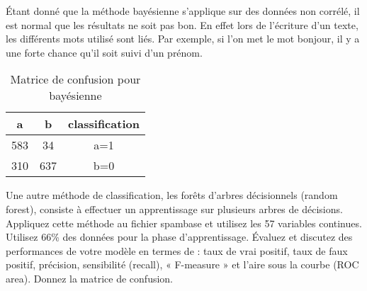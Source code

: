 \begin{homeworkProblem}
\begin{homeworkSection}{3.2}
{			Étant donné que la méthode bayésienne s'applique sur des données non corrélé, il est normal que les résultats ne soit pas bon.
			En effet lors de l'écriture d'un texte, les différents mots utilisé sont liés.
			Par exemple, si l'on met le mot bonjour, il y a une forte chance qu'il soit suivi d'un prénom.
			
			}
			\begin{table}
			\centering
			\begin{tabular}{|c|c||c|}
			
			\hline 
			a & b & classification \\ 
			\hline 
			583 & 34 & a=1 \\ 
			\hline 
			310 & 637 & b=0 \\ 
			\hline 
			\end{tabular} 
			\caption{Matrice de confusion pour bayésienne}
			\label{tab:confMat32}			
			\end{table}			
			
		\end{homeworkSection}
			
		\begin{homeworkSection}{3.3}

			Une autre méthode de classification, les forêts d'arbres décisionnels (random forest), consiste à
			effectuer un apprentissage sur plusieurs arbres de décisions. Appliquez
			cette méthode au fichier spambase et utilisez les 57 variables continues. Utilisez 66\% des
			données pour la phase d'apprentissage.
			Évaluez et discutez des performances de votre modèle en termes de : taux de vrai positif,
			taux de faux positif, précision, sensibilité (recall), « F-measure » et l’aire sous la courbe
			(ROC area). Donnez la matrice de confusion.

\end{homeworkSection}
\end{homeworkProblem}
